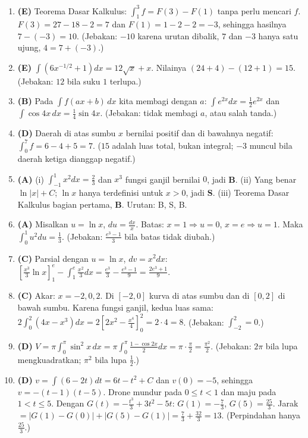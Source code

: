 \documentclass[a4paper,11pt]{article}
\begin{document}
\small\begin{enumerate}[leftmargin=2em,itemsep=2pt,topsep=2pt]
\item[\textbf{1.}] \textbf{(E)} Teorema Dasar Kalkulus: $\int_1^3f=F(3)-F(1)$ tanpa perlu mencari $f$. $F(3)=27-18-2=7$ dan $F(1)=1-2-2=-3$, sehingga hasilnya $7-(-3)=10$. (Jebakan: $-10$ karena urutan dibalik, $7$ dan $-3$ hanya satu ujung, $4=7+(-3)$.)
\item[\textbf{2.}] \textbf{(E)} $\int\left(6x^{-1/2}+1\right)dx=12\sqrt x+x$. Nilainya $(24+4)-(12+1)=15$. (Jebakan: $12$ bila suku $1$ terlupa.)
\item[\textbf{3.}] \textbf{(B)} Pada $\int f(ax+b)\,dx$ kita membagi dengan $a$: $\int e^{2x}dx=\frac12e^{2x}$ dan $\int\cos4x\,dx=\frac14\sin4x$. (Jebakan: tidak membagi $a$, atau salah tanda.)
\item[\textbf{4.}] \textbf{(D)} Daerah di atas sumbu $x$ bernilai positif dan di bawahnya negatif: $\int_0^7f=6-4+5=7$. ($15$ adalah luas total, bukan integral; $-3$ muncul bila daerah ketiga dianggap negatif.)
\item[\textbf{5.}] \textbf{(A)} (i) $\int_{-1}^1x^2dx=\frac23$ dan $x^3$ fungsi ganjil bernilai $0$, jadi \textbf{B}. (ii) Yang benar $\ln|x|+C$; $\ln x$ hanya terdefinisi untuk $x>0$, jadi \textbf{S}. (iii) Teorema Dasar Kalkulus bagian pertama, \textbf{B}. Urutan: B, S, B.
\item[\textbf{6.}] \textbf{(A)} Misalkan $u=\ln x$, $du=\frac{dx}{x}$. Batas: $x=1\Rightarrow u=0$, $x=e\Rightarrow u=1$. Maka $\int_0^1u^2du=\frac13$. (Jebakan: $\frac{e^3-1}{3}$ bila batas tidak diubah.)
\item[\textbf{7.}] \textbf{(C)} Parsial dengan $u=\ln x$, $dv=x^2dx$: $\left[\frac{x^3}{3}\ln x\right]_1^e-\int_1^e\frac{x^2}{3}dx=\frac{e^3}{3}-\frac{e^3-1}{9}=\frac{2e^3+1}{9}$.
\item[\textbf{8.}] \textbf{(C)} Akar: $x=-2,0,2$. Di $[-2,0]$ kurva di atas sumbu dan di $[0,2]$ di bawah sumbu. Karena fungsi ganjil, kedua luas sama: $2\int_0^2(4x-x^3)dx=2\left[2x^2-\frac{x^4}{4}\right]_0^2=2\cdot4=8$. (Jebakan: $\int_{-2}^2=0$.)
\item[\textbf{9.}] \textbf{(D)} $V=\pi\int_0^\pi\sin^2x\,dx=\pi\int_0^\pi\frac{1-\cos2x}{2}dx=\pi\cdot\frac\pi2=\frac{\pi^2}{2}$. (Jebakan: $2\pi$ bila lupa mengkuadratkan; $\pi^2$ bila lupa $\frac12$.)
\item[\textbf{10.}] \textbf{(D)} $v=\int(6-2t)dt=6t-t^2+C$ dan $v(0)=-5$, sehingga $v=-(t-1)(t-5)$. Drone mundur pada $0\le t<1$ dan maju pada $1<t\le5$. Dengan $G(t)=-\frac{t^3}{3}+3t^2-5t$: $G(1)=-\frac73$, $G(5)=\frac{25}{3}$. Jarak $=\left|G(1)-G(0)\right|+\left|G(5)-G(1)\right|=\frac73+\frac{32}{3}=13$. (Perpindahan hanya $\frac{25}{3}$.)

\end{enumerate}
\end{document}
